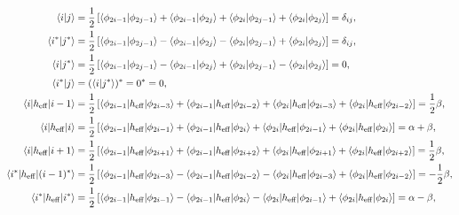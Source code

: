 \documentclass[a4paper]{book}
\newcommand{\heff}{h_{\rm eff}}
\begin{document}
	\begin{solution}
	
	\begin{align*}
		\langle i | j \rangle &= \frac{1}{2} \left[ \langle \phi_{2i-1} | \phi_{2j-1} \rangle + \langle \phi_{2i-1} | \phi_{2j} \rangle + \langle \phi_{2i} | \phi_{2j-1} \rangle + \langle \phi_{2i} | \phi_{2j} \rangle \right] = \delta_{ij}, \\
		\langle i^* | j^* \rangle &= \frac{1}{2} \left[ \langle \phi_{2i-1} | \phi_{2j-1} \rangle - \langle \phi_{2i-1} | \phi_{2j} \rangle - \langle \phi_{2i} | \phi_{2j-1} \rangle + \langle \phi_{2i} | \phi_{2j} \rangle \right] = \delta_{ij}, \\
		\langle i | j^* \rangle &= \frac{1}{2} \left[ \langle \phi_{2i-1} | \phi_{2j-1} \rangle - \langle \phi_{2i-1} | \phi_{2j} \rangle + \langle \phi_{2i} | \phi_{2j-1} \rangle - \langle \phi_{2i} | \phi_{2j} \rangle \right] = 0, \\
		\langle i^* | j \rangle &= ( \langle i | j^* \rangle )^* = 0^* = 0 , \\
		\langle i | \heff | i-1 \rangle &= \frac{1}{2} \left[ \langle \phi_{2i-1} | \heff | \phi_{2i-3} \rangle + \langle \phi_{2i-1} | \heff | \phi_{2i-2} \rangle + \langle \phi_{2i} | \heff | \phi_{2i-3} \rangle + \langle \phi_{2i} | \heff | \phi_{2i-2} \rangle \right] = \frac{1}{2} \beta , \\
		\langle i | \heff | i \rangle &= \frac{1}{2} \left[ \langle \phi_{2i-1} | \heff | \phi_{2i-1} \rangle + \langle \phi_{2i-1} | \heff | \phi_{2i} \rangle + \langle \phi_{2i} | \heff | \phi_{2i-1} \rangle + \langle \phi_{2i} | \heff | \phi_{2i} \rangle \right] = \alpha + \beta , \\
		\langle i | \heff | i+1 \rangle &= \frac{1}{2} \left[ \langle \phi_{2i-1} | \heff | \phi_{2i+1} \rangle + \langle \phi_{2i-1} | \heff | \phi_{2i+2} \rangle + \langle \phi_{2i} | \heff | \phi_{2i+1} \rangle + \langle \phi_{2i} | \heff | \phi_{2i+2} \rangle \right] = \frac{1}{2} \beta , \\
		\langle i^* | \heff | (i-1)^* \rangle &= \frac{1}{2} \left[ \langle \phi_{2i-1} | \heff | \phi_{2i-3} \rangle - \langle \phi_{2i-1} | \heff | \phi_{2i-2} \rangle - \langle \phi_{2i} | \heff | \phi_{2i-3} \rangle + \langle \phi_{2i} | \heff | \phi_{2i-2} \rangle \right] = -\frac{1}{2} \beta , \\
		\langle i^* | \heff | i^* \rangle &= \frac{1}{2} \left[ \langle \phi_{2i-1} | \heff | \phi_{2i-1} \rangle - \langle \phi_{2i-1} | \heff | \phi_{2i} \rangle - \langle \phi_{2i} | \heff | \phi_{2i-1} \rangle + \langle \phi_{2i} | \heff | \phi_{2i} \rangle \right] = \alpha - \beta , \\

\end{align*}
\end{solution}
\end{document}

